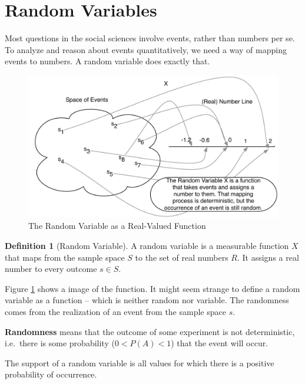 \documentclass[
]{book}
\theoremstyle{definition}
\newtheorem{definition}{Definition}[chapter]
\theoremstyle{definition}
\theoremstyle{definition}
\theoremstyle{remark}
\begin{document}
\hypertarget{random-variables}{%
\section{Random Variables}\label{random-variables}}

Most questions in the social sciences involve events, rather than numbers per se. To analyze and reason about events quantitatively, we need a way of mapping events to numbers. A random variable does exactly that.

\begin{figure}
\centering
\includegraphics{images/rv.pdf}
\caption{\label{fig:rv-image}The Random Variable as a Real-Valued Function}
\end{figure}

\begin{definition}[Random Variable]
\protect\hypertarget{def:unnamed-chunk-71}{}{\label{def:unnamed-chunk-71} {} }
A random variable is a measurable function \(X\) that maps from the sample space \(S\) to the set of real numbers \(R.\) It assigns a real number to every outcome \(s \in S\).
\end{definition}

Figure \ref{fig:rv-image} shows a image of the function. It might seem strange to define a random variable as a function -- which is neither random nor variable. The randomness comes from the realization of an event from the sample space \(s\).

\textbf{Randomness} means that the outcome of some experiment is not deterministic, i.e.~there is some probability (\(0 < P(A) < 1\)) that the event will occur.

The support of a random variable is all values for which there is a positive probability of occurrence.
\end{document}
